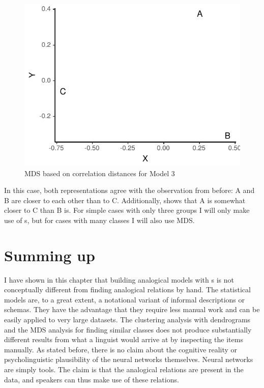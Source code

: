 \begin{figure}%
  \centering
  \includegraphics{./figures/fake/mds3.pdf}
  \caption{MDS based on correlation distances for Model 3}\label{fig:mds-model3}
\end{figure}

In this case, both representations agree with the observation from before: A and B are closer to each other than to C. Additionally,  shows that A is somewhat closer to C than B is. For simple cases with only three groups I will only make use of s, but for cases with many classes I will also use MDS.

\section{Summing up}

I have shown in this chapter that building analogical models with s is not conceptually different from finding analogical relations by hand. The statistical models are, to a great extent, a notational variant of informal descriptions or schemas. They have the advantage that they require less manual work and can be easily applied to very large datasets. The clustering analysis with dendrograms and the MDS analysis for finding similar classes does not produce substantially different results from what a linguist would arrive at by inspecting the items manually. As stated before, there is no claim about the cognitive reality or psycholinguistic plausibility of the neural networks themselves. Neural networks are simply tools. The claim is that the analogical relations are present in the data, and speakers can thus make use of these relations.

